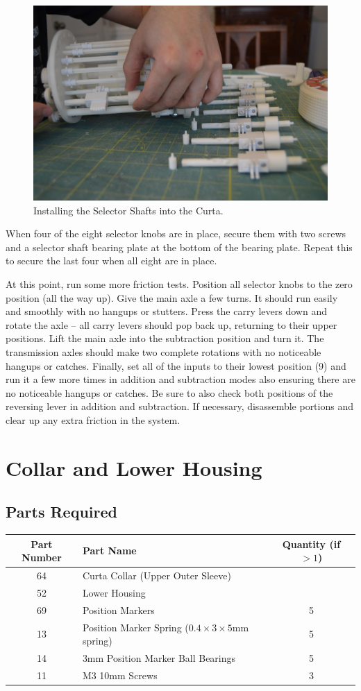 \documentclass[openany]{book}
\begin{document}
\begin{figure}[!ht]
	\centering
	\includegraphics[width=.75\textwidth]{images/image33.jpg}
	\caption{Installing the Selector Shafts into the Curta.}
	\label{fig:image33}	
\end{figure}

When four of the eight selector knobs are in place, secure them with two screws and a selector shaft bearing plate at the bottom of the bearing plate. Repeat this to secure the last four when all eight are in place.

At this point, run some more friction tests. Position all selector knobs to the zero position (all the way up). Give the main axle a few turns. It should run easily and smoothly with no hangups or stutters. Press the carry levers down and rotate the axle -- all carry levers should pop back up, returning to their upper positions. Lift the main axle into the subtraction position and turn it. The transmission axles should make two complete rotations with no noticeable hangups or catches. Finally, set all of the inputs to their lowest position (9) and run it a few more times in addition and subtraction modes also ensuring there are no noticeable hangups or catches. Be sure to also check both positions of the reversing lever in addition and subtraction. If necessary, disassemble portions and clear up any extra friction in the system.



\chapter{Collar and Lower Housing}
\section{Parts Required}
\begin{table}[!ht]
	\centering
	\begin{tabular}{clc}
		Part Number & Part Name & Quantity (if $>1$) \\ \hline
		64 & Curta Collar (Upper Outer Sleeve) & \\
		52 & Lower Housing & \\
		69 & Position Markers & 5 \\ \hline \hline
		13 & Position Marker Spring ($0.4\times3\times5$mm spring) & 5 \\
		14 & 3mm Position Marker Ball Bearings & 5 \\
		11 & M3 10mm Screws & 3
	\end{tabular}
\end{table}
\end{document}
